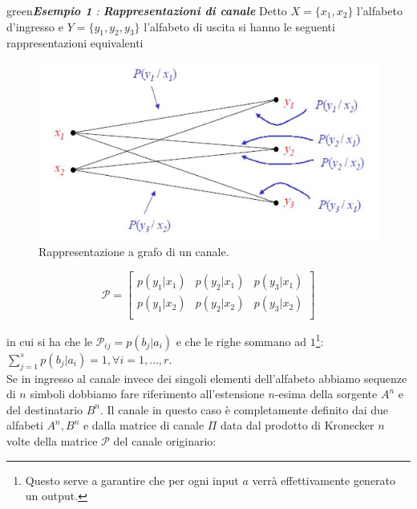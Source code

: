 \begin{mybox}{green}{\textit{\textbf{Esempio 1} : \textbf{Rappresentazioni di canale}}}
Detto $X=\{x_1, x_2\}$ l'alfabeto d'ingresso e $Y = \{y_1, y_2, y_3\}$ l'alfabeto di uscita si hanno le seguenti rappresentazioni equivalenti

\begin{minipage}{0.45\textwidth}
\begin{figure}[H]
    \centering
    \includegraphics[scale=0.2]{img/grafo.jpg}
    \caption{Rappresentazione a grafo di un canale.}
\end{figure}
\end{minipage}
\begin{minipage}{0.45\textwidth}
\begin{equation*}
    \mathcal{P} = \begin{bmatrix}
    p(y_1|x_1) & p(y_2|x_1) & p(y_3|x_1) \\
    p(y_1|x_2) & p(y_2|x_2) & p(y_3|x_2) \\
    \end{bmatrix}
\end{equation*}
\end{minipage}
\end{mybox}
in cui si ha che le $\mathcal{P}_{ij} = p(b_j|a_i)$ e che le righe sommano ad $1$\footnote{Questo serve a garantire che per ogni input $a$ verr\`a effettivamente generato un output.}: $\sum_{j=1}^s p(b_j|a_i) = 1, \forall i=1,\dots,r$. \\
Se in ingresso al canale invece dei singoli elementi dell’alfabeto abbiamo sequenze di $n$ simboli dobbiamo fare riferimento all'estensione $n$-esima della sorgente $A^n$ e del destinatario $B^n$. Il canale in questo caso \`e completamente definito dai due alfabeti $A^n, B^n$ e dalla matrice di canale $\Pi$ data dal prodotto di Kronecker $n$ volte della matrice $\mathcal{P}$ del canale originario:
